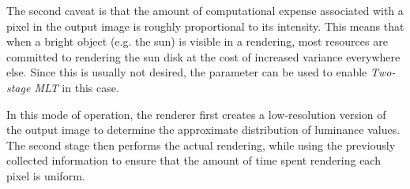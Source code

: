The second caveat is that the amount of computational expense
associated with a pixel in the output image is roughly proportional to
its intensity. This means that when a bright object (e.g. the sun) is
visible in a rendering, most resources are committed to rendering the
sun disk at the cost of increased variance everywhere else. Since this is
usually not desired, the  parameter can be used to
enable \emph{Two-stage MLT} in this case.

In this mode of operation, the renderer first creates a low-resolution
version of the output image to determine the approximate distribution of
luminance values. The second stage then performs the actual rendering, while
using the previously collected information to ensure that
the amount of time spent rendering each pixel is uniform.

